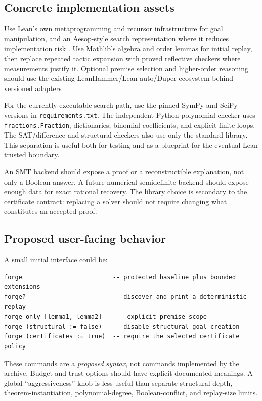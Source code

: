 \documentclass[11pt,letterpaper]{article}
\newcommand{\code}[1]{\texttt{#1}}
\theoremstyle{definition}\newtheorem{definition}[theorem]{Definition}
\theoremstyle{remark}\newtheorem{remark}[theorem]{Remark}
\begin{document}
\subsection{Concrete implementation assets}
Use Lean's own metaprogramming and recursor infrastructure for goal manipulation, and an Aesop-style search representation where it reduces implementation risk \cite{aesop}. Use Mathlib's algebra and order lemmas for initial replay, then replace repeated tactic expansion with proved reflective checkers where measurements justify it. Optional premise selection and higher-order reasoning should use the existing LeanHammer/Lean-auto/Duper ecosystem behind versioned adapters \cite{hammer,auto,duper}.

For the currently executable search path, use the pinned SymPy and SciPy versions in \code{requirements.txt}. The independent Python polynomial checker uses \code{fractions.Fraction}, dictionaries, binomial coefficients, and explicit finite loops. The SAT/difference and structural checkers also use only the standard library. This separation is useful both for testing and as a blueprint for the eventual Lean trusted boundary.

An SMT backend should expose a proof or a reconstructible explanation, not only a Boolean answer. A future numerical semidefinite backend should expose enough data for exact rational recovery. The library choice is secondary to the certificate contract: replacing a solver should not require changing what constitutes an accepted proof.

\subsection{Proposed user-facing behavior}
A small initial interface could be:
\par\noindent
\begin{minipage}{\linewidth}
\begin{lstlisting}
forge                         -- protected baseline plus bounded extensions
forge?                        -- discover and print a deterministic replay
forge only [lemma1, lemma2]    -- explicit premise scope
forge (structural := false)   -- disable structural goal creation
forge (certificates := true)  -- require the selected certificate policy
\end{lstlisting}
\end{minipage}\par

These commands are a \emph{proposed syntax}, not commands implemented by the archive. Budget and trust options should have explicit documented meanings. A global ``aggressiveness'' knob is less useful than separate structural depth, theorem-instantiation, polynomial-degree, Boolean-conflict, and replay-size limits.
\end{document}
